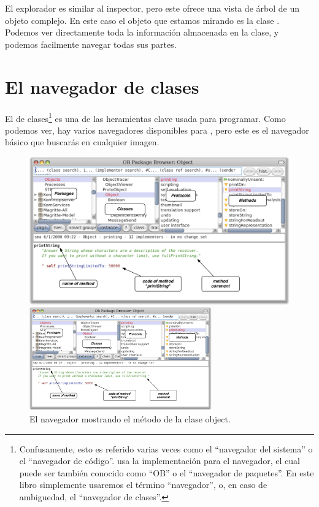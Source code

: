 \documentclass[a4paper,10pt,twoside]{book}
\begin{document}
El explorador es similar al inspector, pero este ofrece una vista de \'arbol de un objeto complejo.
En este caso el objeto que estamos mirando es la clase .
Podemos ver directamente toda la informaci\'on almacenada en la clase, y podemos facilmente navegar todas sus partes.

\section{El navegador de clases}

El  de clases\footnote{Confusamente, esto es referido varias veces como el ``navegador del sistema'' o el ``navegador de c\'odigo''. \pharo usa la implementaci\'on  para el navegador, el cual puede ser tambi\'en conocido como ``OB'' o el ``navegador de paquetes''.
En este libro simplemente usaremos el t\'ermino ``navegador'', o, en caso de ambiguedad, el ``navegador de clases''.} es una de las heramientas clave usada para programar.
Como podemos ver, hay varios navegadores disponibles para \pharo, pero este es el navegador b\'asico que buscar\'as en cualquier imagen.


\begin{figure}[htb]
\ifluluelse
	{\centerline {\includegraphics[width=\textwidth]{ClassBrowser1}}}
	{\centerline {\includegraphics[width=0.7\textwidth]{ClassBrowser1}}}
\caption{El navegador mostrando el m\'etodo  de la clase object.
}
\end{figure}
\end{document}
